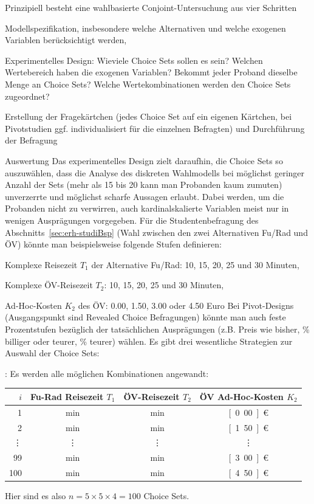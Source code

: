Prinzipiell besteht eine wahlbasierte Conjoint-Untersuchung aus vier
Schritten
\benum
\item Modellspezifikation, insbesondere welche Alternativen und welche
  exogenen Variablen ber\"ucksich\-tigt werden,
\item Experimentelles Design: Wieviele Choice Sets sollen es sein? Welchen
  Wertebereich haben die exogenen 
  Variablen? Bekommt jeder Proband dieselbe Menge an Choice Sets?
  Welche  Wertekombinationen werden den Choice Sets
  zugeordnet?
\item Erstellung der Fragek\"artchen (jedes Choice Set auf ein
  eigenen K\"artchen, bei Pivotstudien ggf. individualisiert f\"ur die
  einzelnen Befragten) und Durchf\"uhrung der Befragung
\item Auswertung
\eenum
%
Das experimentelles Design zielt daraufhin, die Choice Sets so
auszuw\"ahlen, dass die Analyse des diskreten Wahlmodells 
 bei m\"oglichst geringer Anzahl der Sets (mehr als
15 bis 20 kann man Probanden kaum zumuten) unverzerrte und
m\"oglichst scharfe Aussagen erlaubt. Dabei werden, um die
Probanden nicht zu verwirren, auch
kardinalskalierte Variablen meist nur in wenigen Auspr\"agungen
vorgegeben. F\"ur die Studentenbefragung des
Abschnitts~\ref{sec:erh-studiBsp} (Wahl zwischen den zwei Alternativen
Fu\3/Rad und \"OV) k\"onnte man beispielsweise folgende Stufen definieren:
\bi
\item Komplexe Reisezeit $T_1$ der Alternative Fu\3/Rad: 10, 15, 20, 25 und 30
  Minuten,
\item Komplexe \"OV-Reisezeit  $T_2$: 10, 15, 20, 25 und 30
  Minuten,
\item Ad-Hoc-Kosten $K_2$ des \"OV: 0.00, 1.50, 3.00 oder 4.50 Euro
\ei
Bei Pivot-Designs (Ausgangspunkt sind Revealed Choice Befragungen)
k\"onnte man auch feste Prozentstufen bez\"uglich der tats\"achlichen
Auspr\"agungen (z.B. Preis wie bisher, \unit[20]{\%} billiger oder
teurer,  \unit[40]{\%} teurer) w\"ahlen. 
Es gibt drei wesentliche Strategien zur Auswahl der Choice Sets:
\vspace{1em}

\noindent
{}:
 Es werden alle m\"oglichen Kombinationen angewandt:
\begin{center}
\begin{tabular}{|r|c|c|c|} \hline
$i$ & Fu\3-Rad Reisezeit $T_1$ & \"OV-Reisezeit  $T_2$ & \"OV Ad-Hoc-Kosten $K_2$
   \\ \hline
1 & \unit[10]{min} & \unit[10]{min} & \unit[0.00]{\euro{}}\\
2 & \unit[10]{min} & \unit[10]{min} &\unit[1.50]{\euro{}}\\
\vdots & \vdots & \vdots & \vdots  \\
99 & \unit[30]{min} & \unit[30]{min} & \unit[3.00]{\euro{}}\\
100 & \unit[30]{min} & \unit[30]{min} & \unit[4.50]{\euro{}}\\
 \hline
\end{tabular}
\end{center}
Hier sind es also $n=5\times 5 \times 4=100$ Choice Sets.
\vspace{1ex}

